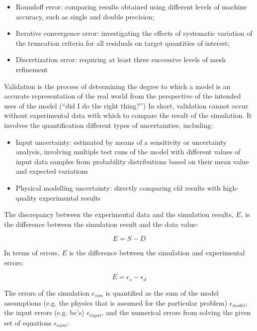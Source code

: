 \documentclass[double,12pt]{beavtex}
\begin{document}
\begin{itemize}
    \item Roundoff error: comparing results obtained using different levels of machine accuracy, such as single and double precision;
    \item Iterative convergence error: investigating the effects of systematic variation of the truncation criteria for all residuals on target quantities of interest;
    \item Discretization error: requiring at least three successive levels of mesh refinement
\end{itemize}

Validation is the process of determining the degree to which a model is an accurate representation of the real world from the perspective of the intended uses of the model (“did I do the right thing?”) In short, validation cannot occur without experimental data with which to compare the result of the simulation. It involves the quantification different types of uncertainties, including:

\begin{itemize}
    \item Input uncertainty: estimated by means of a sensitivity or uncertainty analysis, involving multiple test runs of the model with different values of input data samples from probability distributions based on their mean value and expected variations
    \item Physical modelling uncertainty: directly comparing \acrshort{cfd} results with high-quality experimental results
\end{itemize}

The discrepancy between the experimental data and the simulation results, $E$, is the difference between the simulation result and the data value:

\begin{equation}
    E = S - D
\label{eq:Discrepancy_Equation}
\end{equation}

In terms of errors, $E$ is the difference between the simulation and experimental errors:

\begin{equation}
    E = \epsilon_{s}-\epsilon_{d}
\label{eq:Sim_Exp_Error}
\end{equation}

The errors of the simulation $\epsilon_{sim}$ is quantified as the sum of the model assumptions (e.g. the physics that is assumed for the particular problem) $\epsilon_{model}$, the input errors (e.g. \acrshort{bc}'s) $\epsilon_{input}$, and the numerical errors from solving the given set of equations $\epsilon_{num}$:
\end{document}
